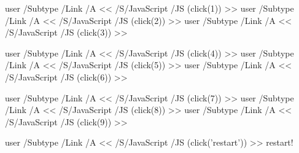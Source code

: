 \documentclass[a4paper,10pt]{article}
\begin{document}
\hfill{}
\leavevmode
\pdfstartlink%
user {
    /Subtype /Link
    /A <<
        /S/JavaScript
        /JS (click(1))
    >>
}\phantom{\rule{20pt}{20pt}}\pdfendlink
\pdfstartlink%
user {
    /Subtype /Link
    /A <<
        /S/JavaScript
        /JS (click(2))
    >>
}\phantom{\rule{20pt}{20pt}}\pdfendlink
\pdfstartlink%
user {
    /Subtype /Link
    /A <<
        /S/JavaScript
        /JS (click(3))
    >>
}\phantom{\rule{20pt}{20pt}}\pdfendlink
\hfill{}


\hfill{}
\leavevmode
\pdfstartlink%
user {
    /Subtype /Link
    /A <<
        /S/JavaScript
        /JS (click(4))
    >>
}\phantom{\rule{20pt}{20pt}}\pdfendlink
\pdfstartlink%
user {
    /Subtype /Link
    /A <<
        /S/JavaScript
        /JS (click(5))
    >>
}\phantom{\rule{20pt}{20pt}}\pdfendlink
\pdfstartlink%
user {
    /Subtype /Link
    /A <<
        /S/JavaScript
        /JS (click(6))
    >>
}\phantom{\rule{20pt}{20pt}}\pdfendlink
\hfill{}


\hfill{}
\leavevmode
\pdfstartlink%
user {
    /Subtype /Link
    /A <<
        /S/JavaScript
        /JS (click(7))
    >>
}\phantom{\rule{20pt}{20pt}}\pdfendlink
\pdfstartlink%
user {
    /Subtype /Link
    /A <<
        /S/JavaScript
        /JS (click(8))
    >>
}\phantom{\rule{20pt}{20pt}}\pdfendlink
\pdfstartlink%
user {
    /Subtype /Link
    /A <<
        /S/JavaScript
        /JS (click(9))
    >>
}\phantom{\rule{20pt}{20pt}}\pdfendlink
\hfill{}


\hfill{}
\leavevmode
\pdfstartlink%
user {
    /Subtype /Link
    /A <<
        /S/JavaScript
        /JS (click('restart'))
    >>
} restart! \pdfendlink
\hfill{}
\end{document}
